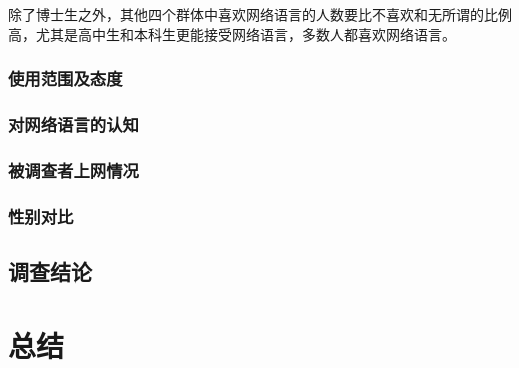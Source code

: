 除了博士生之外，其他四个群体中喜欢网络语言的人数要比不喜欢和无所谓的比例高，尤其是高中生和本科生更能接受网络语言，多数人都喜欢网络语言。

\subsubsection{使用范围及态度}



\subsubsection{对网络语言的认知}



\subsubsection{被调查者上网情况}



\subsubsection{性别对比}



\subsection{调查结论}



\section{总结}


